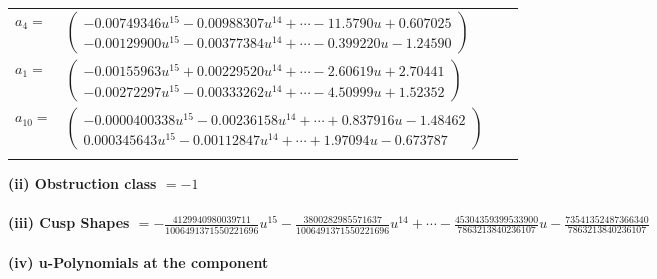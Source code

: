 \documentclass[1p]{elsarticle_modified}
\theoremstyle{definition}
\begin{document}
\begin{tabular}{m{7pt} m{180pt} m{7pt} m{180pt} }
\flushright $a_{4}=$&$\begin{pmatrix}-0.00749346 u^{15}-0.00988307 u^{14}+\cdots-11.5790 u+0.607025\\-0.00129900 u^{15}-0.00377384 u^{14}+\cdots-0.399220 u-1.24590\end{pmatrix}$ \\
\flushright $a_{1}=$&$\begin{pmatrix}-0.00155963 u^{15}+0.00229520 u^{14}+\cdots-2.60619 u+2.70441\\-0.00272297 u^{15}-0.00333262 u^{14}+\cdots-4.50999 u+1.52352\end{pmatrix}$ \\
\flushright $a_{10}=$&$\begin{pmatrix}-0.0000400338 u^{15}-0.00236158 u^{14}+\cdots+0.837916 u-1.48462\\0.000345643 u^{15}-0.00112847 u^{14}+\cdots+1.97094 u-0.673787\end{pmatrix}$\\&\end{tabular}
\flushleft \textbf{(ii) Obstruction class $= -1$}\\~\\
\flushleft \textbf{(iii) Cusp Shapes $= -\frac{4129940980039711}{1006491371550221696} u^{15}-\frac{3800282985571637}{1006491371550221696} u^{14}+\cdots-\frac{45304359399533900}{7863213840236107} u-\frac{73541352487366340}{7863213840236107}$}\\~\\
\newpage\renewcommand{\arraystretch}{1}
\flushleft \textbf{(iv) u-Polynomials at the component}\newline \\
\end{document}
